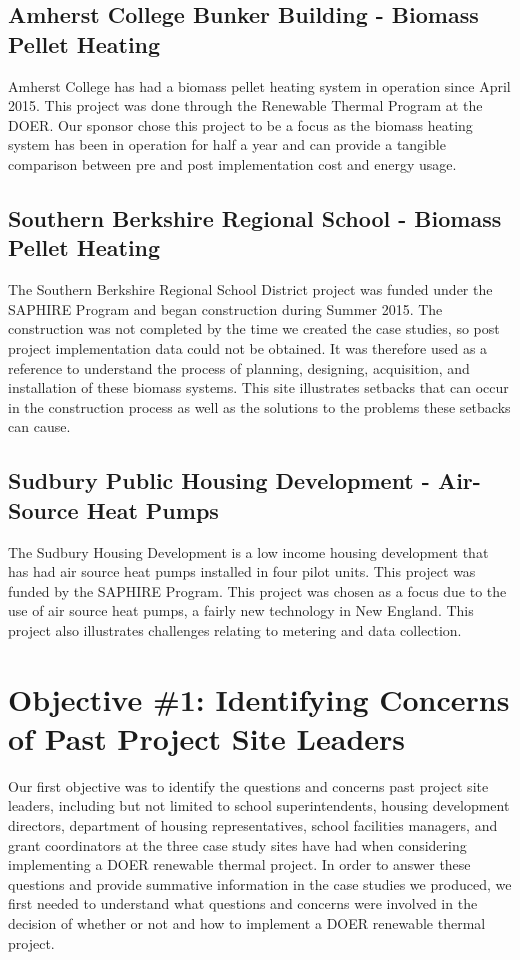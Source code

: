     \subsection{Amherst College Bunker Building - Biomass Pellet Heating}
    \par Amherst College has had a biomass pellet heating system in operation since April 2015. This project was done through the Renewable Thermal Program at the DOER. Our sponsor chose this project to be a focus as the biomass heating system has been in operation for half a year and can provide a tangible comparison between pre and post implementation cost and energy usage.

    \subsection{Southern Berkshire Regional School - Biomass Pellet Heating}
    \par The Southern Berkshire Regional School District project was funded under the SAPHIRE Program and began construction during Summer 2015. The construction was not completed by the time we created the case studies, so post project implementation data could not be obtained. It was therefore used as a reference to understand the process of planning, designing, acquisition, and installation of these biomass systems. This site illustrates setbacks that can occur in the construction process as well as the solutions to the problems these setbacks can cause.

    \subsection{Sudbury Public Housing Development - Air-Source Heat Pumps}
    \par The Sudbury Housing Development is a low income housing development that has had air source heat pumps installed in four pilot units. This project was funded by the SAPHIRE Program. This project was chosen as a focus due to the use of air source heat pumps, a fairly new technology in New England. This project also illustrates challenges relating to metering and data collection.

  \section{Objective \#1: Identifying Concerns of Past Project Site Leaders}
  \par Our first objective was to identify the questions and concerns past project site leaders, including but not limited to school superintendents, housing development directors, department of housing representatives, school facilities managers, and grant coordinators at the three case study sites have had when considering implementing a DOER renewable thermal project. In order to answer these questions and provide summative information in the case studies we produced, we first needed to understand what questions and concerns were involved in the decision of whether or not and how to implement a DOER renewable thermal project. 

